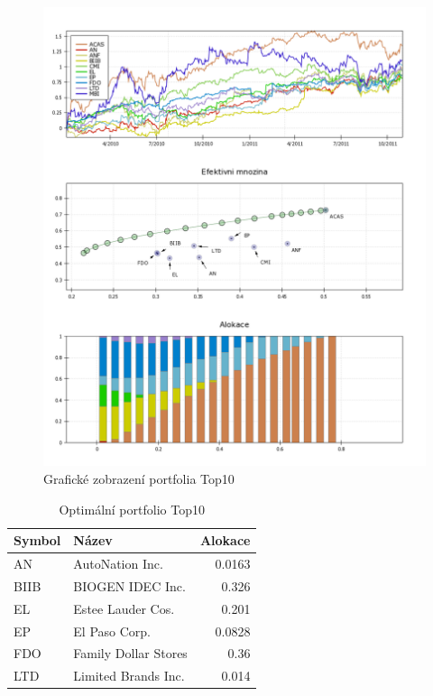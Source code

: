 \documentclass[12pt,a4paper]{report}
\begin{document}
    \begin{figure}[htb]
      \centering
        \includegraphics[height=0.90\textheight]{top10.png}
       \caption{Grafické zobrazení portfolia Top10}
    \end{figure}

    \begin{table}[htb]
      \centering
      \begin{tabular}{|l|l|r|}
        \hline
        Symbol&Název&Alokace\\\hline\hline
        AN&AutoNation Inc. &0.0163\\\hline
        BIIB&BIOGEN IDEC Inc. &0.326\\\hline
        EL&Estee Lauder Cos. &0.201\\\hline
        EP&El Paso Corp. &0.0828\\\hline
        FDO&Family Dollar Stores &0.36\\\hline
        LTD&Limited Brands Inc. &0.014\\\hline

      \end{tabular}
      \caption{Optimální portfolio Top10}
    \end{table}
\end{document}
